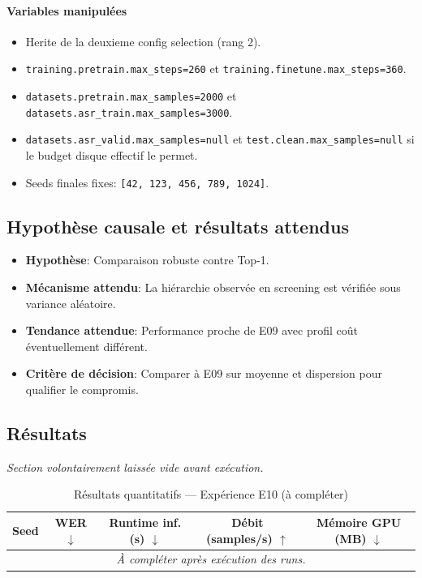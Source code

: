 \documentclass[11pt,a4paper]{article}
\begin{document}
\paragraph{Variables manipulées}
\begin{itemize}
\item Herite de la deuxieme config selection (rang 2).
\item \texttt{training.pretrain.max\_steps=260} et \texttt{training.finetune.max\_steps=360}.
\item \texttt{datasets.pretrain.max\_samples=2000} et \texttt{datasets.asr\_train.max\_samples=3000}.
\item \texttt{datasets.asr\_valid.max\_samples=null} et \texttt{test.clean.max\_samples=null} si le budget disque effectif le permet.
\item Seeds finales fixes: \texttt{[42, 123, 456, 789, 1024]}.
\end{itemize}

\subsection{Hypothèse causale et résultats attendus}
\begin{itemize}[leftmargin=1.2cm]
\item \textbf{Hypothèse}: Comparaison robuste contre Top-1.
\item \textbf{Mécanisme attendu}: La hiérarchie observée en screening est vérifiée sous variance aléatoire.
\item \textbf{Tendance attendue}: Performance proche de E09 avec profil coût éventuellement différent.
\item \textbf{Critère de décision}: Comparer à E09 sur moyenne et dispersion pour qualifier le compromis.
\end{itemize}

\subsection{Résultats}
\textit{Section volontairement laissée vide avant exécution.}

\begin{table}[H]
\centering
\caption{Résultats quantitatifs --- Expérience E10 (à compléter)}
\begin{tabular}{lcccc}
\toprule
Seed & WER $\downarrow$ & Runtime inf. (s) $\downarrow$ & Débit (samples/s) $\uparrow$ & Mémoire GPU (MB) $\downarrow$ \\
\midrule
\multicolumn{5}{c}{\textit{À compléter après exécution des runs.}} \\
\bottomrule
\end{tabular}
\end{table}
\end{document}
